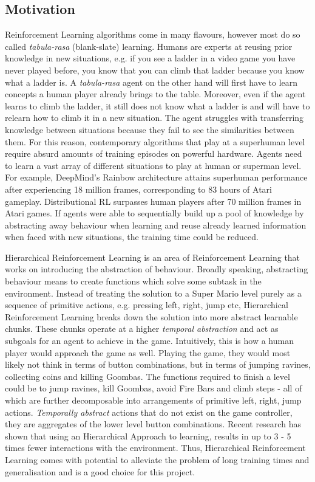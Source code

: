 \documentclass[notitlepage,a4paper,11pt]{article}
\begin{document}
\subsection{Motivation}
Reinforcement Learning algorithms come in many flavours, however most do so called \textit{tabula-rasa} (blank-slate) learning. Humans are experts at reusing prior knowledge in new situations, e.g. if you see a ladder in a video game you have never played before, you know that you can climb that ladder because you know what a ladder is. A \textit{tabula-rasa} agent on the other hand will first have to learn concepts a human player already brings to the table. Moreover, even if the agent learns to climb the ladder, it still does not know what a ladder is and will have to relearn how to climb it in a new situation. The agent struggles with transferring knowledge between situations because they fail to see the similarities between them. For this reason, contemporary algorithms that play at a superhuman level require absurd amounts of training episodes on powerful hardware. Agents need to learn a vast array of different situations to play at human or superman level. For example, DeepMind's Rainbow architecture \cite{hessel2018rainbow} attains superhuman performance after experiencing 18 million frames, corresponding to 83 hours of Atari gameplay. Distributional RL \cite{bellemare2017distributional} surpasses human players after 70 million frames in Atari games. If agents were able to sequentially build up a pool of knowledge by abstracting away behaviour when learning and reuse already learned information when faced with new situations, the training time could be reduced. 

Hierarchical Reinforcement Learning is an area of Reinforcement Learning that works on introducing the abstraction of behaviour. Broadly speaking, abstracting behaviour means to create functions which solve some subtask in the environment. Instead of treating the solution to a Super Mario level purely as a sequence of primitive actions, e.g. pressing left, right, jump etc, Hierarchical Reinforcement Learning breaks down the solution into more abstract learnable chunks. These chunks operate at a higher \textit{temporal abstraction} and act as subgoals for an agent to achieve in the game. Intuitively, this is how a human player would approach the game as well. Playing the game, they would most likely not think in terms of button combinations, but in terms of jumping ravines, collecting coins and killing Goombas. The functions required to finish a level could be to jump ravines, kill Goombas, avoid Fire Bars and climb steps - all of which are further decomposable into arrangements of primitive left, right, jump actions. \textit{Temporally abstract}  actions that do not exist on the game controller, they are aggregates of the lower level button combinations. Recent research \cite{nachum2019does} has shown that using an Hierarchical Approach to learning, results in up to 3 - 5 times fewer interactions with the environment. Thus, Hierarchical Reinforcement Learning comes with potential to alleviate the problem of long training times and generalisation and is a good choice for this project. 
\end{document}
